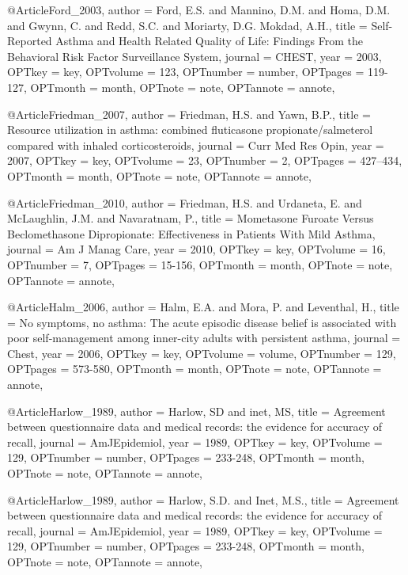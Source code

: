 {{%

@Article{Ford_2003,
author = {Ford, E.S. and Mannino, D.M. and Homa, D.M. and Gwynn, C. and Redd, S.C. and Moriarty, D.G. Mokdad, A.H.},
title = {Self-Reported Asthma and Health Related Quality of Life: Findings From the Behavioral Risk Factor Surveillance System},
journal = {CHEST},
year = {2003},
OPTkey = {key},
OPTvolume = {123},
OPTnumber = {number},
OPTpages = {119-127},
OPTmonth = {month},
OPTnote = {note},
OPTannote = {annote},
}

@Article{Friedman_2007,
author = {Friedman, H.S. and Yawn, B.P.},
title = {Resource utilization in asthma:
combined fluticasone propionate/salmeterol compared with inhaled corticosteroids},
journal = {Curr Med Res Opin},
year = {2007},
OPTkey = {key},
OPTvolume = {23},
OPTnumber = {2},
OPTpages = {427–434},
OPTmonth = {month},
OPTnote = {note},
OPTannote = {annote},
}


@Article{Friedman_2010,
author = {Friedman, H.S. and Urdaneta, E. and McLaughlin, J.M. and Navaratnam, P.},
title = {Mometasone Furoate Versus Beclomethasone Dipropionate: Effectiveness in Patients With Mild Asthma},
journal = {Am J Manag Care},
year = {2010},
OPTkey = {key},
OPTvolume = {16},
OPTnumber = {7},
OPTpages = {15-156},
OPTmonth = {month},
OPTnote = {note},
OPTannote = {annote},
}



@Article{Halm_2006,
author = {Halm, E.A. and Mora, P. and Leventhal, H.},
title = {No symptoms, no asthma: The acute episodic disease belief is associated with poor self-management among inner-city adults with persistent asthma},
journal = {Chest},
year = {2006},
OPTkey = {key},
OPTvolume = {volume},
OPTnumber = {129},
OPTpages = {573-580},
OPTmonth = {month},
OPTnote = {note},
OPTannote = {annote},
}

@Article{Harlow_1989,
author = {Harlow, SD and inet, MS},
title = {Agreement between questionnaire data and medical records: the evidence for accuracy of recall},
journal = {AmJEpidemiol},
year = {1989},
OPTkey = {key},
OPTvolume = {129},
OPTnumber = {number},
OPTpages = {233-248},
OPTmonth = {month},
OPTnote = {note},
OPTannote = {annote},
}

@Article{Harlow_1989,
author = {Harlow, S.D. and Inet, M.S.},
title = {Agreement between questionnaire data and medical records: the evidence for accuracy of recall},
journal = {AmJEpidemiol},
year = {1989},
OPTkey = {key},
OPTvolume = {129},
OPTnumber = {number},
OPTpages = {233-248},
OPTmonth = {month},
OPTnote = {note},
OPTannote = {annote},
}

}}
